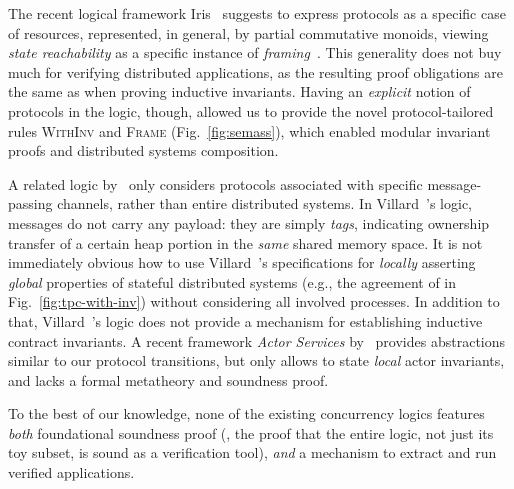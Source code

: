 The recent logical framework Iris~\cite{Jung-al:POPL15,Jung-al:ICFP16}
suggests to express protocols as a specific case of resources,
represented, in general, by partial commutative monoids, viewing
\emph{state reachability} as a specific instance of
\emph{framing}~\cite{Reynolds:LICS02}. This generality does not buy
much for verifying distributed applications, as the resulting proof
obligations are the same as when proving inductive invariants.  Having
an \emph{explicit} notion of protocols in the logic, though, allowed
us to provide the novel protocol-tailored rules \textsc{WithInv} and
\textsc{Frame} (\cf Fig.~\ref{fig:semass}), which enabled modular
invariant proofs and distributed systems composition.

A related logic by~\citet{Villard-al:APLAS09} only considers protocols
associated with specific message-passing channels, rather than entire
distributed systems.
%
%
In Villard~\etal's logic, messages do not carry any payload: they are
simply \emph{tags}, indicating ownership transfer of a certain heap
portion in the \emph{same} shared memory space. It is not immediately
obvious how to use Villard~\etal's specifications for \emph{locally}
asserting \emph{global} properties of stateful distributed systems
(e.g., the agreement of  in Fig.~\ref{fig:tpc-with-inv})
without considering all involved processes.
%
In addition to that, Villard~\etal's logic does not provide a
mechanism for establishing inductive contract invariants.
%
A recent framework \emph{Actor Services}
by~\citet{Summers-Muller:ESOP16} provides abstractions similar to our
protocol transitions, but only allows to state \emph{local} actor
invariants, and lacks a formal metatheory and soundness proof.
%

To the best of our knowledge, none of the existing concurrency logics
features \emph{both} foundational soundness proof (\ie, the proof that
the entire logic, not just its toy subset, is sound as a verification
tool), \emph{and} a mechanism to extract and run verified
applications.
%

